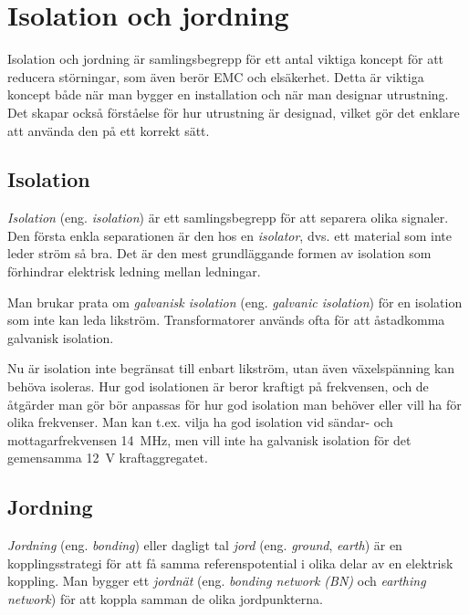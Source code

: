 \chapter[Isolation och jord]{Isolation och jordning}

Isolation och jordning är samlingsbegrepp för ett antal viktiga koncept för
att reducera störningar, som även berör EMC och elsäkerhet.
Detta är viktiga koncept både när man bygger en installation och när man
designar utrustning.
Det skapar också förståelse för hur utrustning är designad, vilket gör det
enklare att använda den på ett korrekt sätt.

\section{Isolation}

\emph{Isolation} (eng. \emph{isolation}) är ett samlingsbegrepp för att separera
olika signaler.
Den första enkla separationen är den hos en \emph{isolator}, dvs. ett material
som inte leder ström så bra.
Det är den mest grundläggande formen av isolation som förhindrar elektrisk
ledning mellan ledningar.

Man brukar prata om \emph{galvanisk isolation} (eng. \emph{galvanic isolation})
för en isolation som inte kan leda likström.
Transformatorer används ofta för att åstadkomma galvanisk isolation.

Nu är isolation inte begränsat till enbart likström, utan även växelspänning
kan behöva isoleras.
Hur god isolationen är beror kraftigt på frekvensen, och de åtgärder man gör
bör anpassas för hur god isolation man behöver eller vill ha för olika
frekvenser.
Man kan t.ex. vilja ha god isolation vid sändar- och mottagarfrekvensen 14~MHz,
men vill inte ha galvanisk isolation för det gemensamma 12~V kraftaggregatet.

\section{Jordning}

\emph{Jordning} (eng. \emph{bonding}) eller dagligt tal \emph{jord} (eng.
\emph{ground}, \emph{earth}) är en kopplingsstrategi för att få samma
referenspotential i olika delar av en elektrisk koppling.
Man bygger ett \emph{jordnät} (eng. \emph{bonding network (BN)}
\cite[kap 3.2.1]{K27-1991} och \emph{earthing network})
\cite[kap 3.1.3]{K27-1991} för att koppla samman de olika jordpunkterna.

